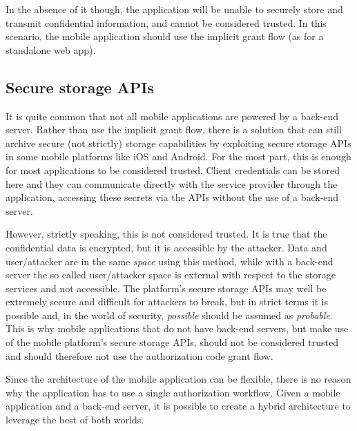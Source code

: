 In the absence of it though, the application will be unable to securely store and transmit confidential information, and cannot be considered trusted. In this scenario, the mobile application should use the implicit grant flow (as for a standalone web app).

\subsection{Secure storage APIs}
It is quite common that not all mobile applications are powered by a back-end server. Rather than use the implicit grant flow, there is a solution that can still archive secure (not strictly) storage capabilities by exploiting secure storage APIs in some mobile platforms like iOS and Android.  For the most part, this is enough for most applications to be considered trusted. Client credentials can be stored here and they can communicate directly with the service provider through the application, accessing these secrets via the APIs without the use of a back-end server.

However, strictly speaking, this is not considered trusted. It is true that the confidential data is encrypted, but it is accessible by the attacker. Data and user/attacker are in the same \textit{space} using this method, while with a back-end server the so called user/attacker space is external with respect to the storage services and not accessible. The platform's secure storage APIs may well be extremely secure and difficult for attackers to break, but in strict terms it is possible and, in the world of security, \textit{possible} should be assumed as \textit{probable}. This is why mobile applications that do not have back-end servers, but make use of the mobile platform's secure storage APIs, should not be considered trusted and should therefore not use the authorization code grant flow.

Since the architecture of the mobile application can be flexible, there is no reason why the application has to use a single authorization workflow. Given a mobile application and a back-end server, it is possible to create a hybrid architecture to leverage the best of both worlds.

